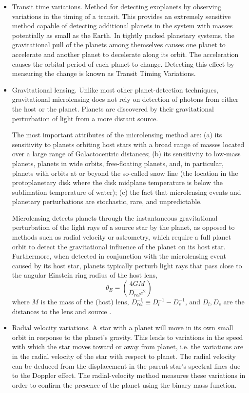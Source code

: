 \begin{itemize}
\item Transit time variations.
Method for detecting exoplanets by observing variations in the timing of a transit. This provides an extremely sensitive method capable of detecting additional planets in the system with masses potentially as small as the Earth. In tightly packed planetary systems, the gravitational pull of the planets among themselves causes one planet to accelerate and another planet to decelerate along its orbit. The acceleration causes the orbital period of each planet to change. Detecting this effect by measuring the change is known as Transit Timing Variations.

\item Gravitational lensing. Unlike most other planet-detection techniques, gravitational microlensing
does not rely on detection of photons from either the host or the planet. Planets are discovered 
by their gravitational perturbation of light from a more distant source.

The most important attributes of the microlensing method are: (a) its sensitivity to planets orbiting
host stars with a broad range of masses located over a large range of Galactocentric distances;
(b) its sensitivity to low-mass planets, planets in wide orbits, free-floating planets, and, in particular,
planets with orbits at or beyond the so-called snow line (the location in the protoplanetary disk
where the disk midplane temperature is below the sublimation temperature of water); (c) the
fact that microlensing events and planetary perturbations are stochastic, rare, and unpredictable.

Microlensing detects planets through the instantaneous gravitational perturbation of the light
rays of a source star by the planet, as opposed to methods such as radial velocity or astrometry,
which require a full planet orbit to detect the gravitational influence of the planet on its host star.
Furthermore, when detected in conjunction with the microlensing event caused by its host star,
planets typically perturb light rays that pass close to the angular Einstein ring radius of the host
lens,
\begin{equation} \label{eq:ml_ring}
\theta_{E}\equiv \left( \dfrac{4GM}{D_{rel}c^{2}} \right) 
\end{equation}
where $M$ is the mass of the (host) lens, $D^{−1}_{rel} \equiv D^{−1}_{l} - D^{−1}_{s}$, and $D_{l},D_{s}$ 
are the distances to the lens and source \citep{gaudi2012}.

\item Radial velocity variations. 
A star with a planet will move in its own small orbit in response to the planet's gravity. This leads to variations in the speed with which the star moves toward or away from planet, i.e. the variations are in the radial velocity of the star with respect to planet. The radial velocity can be deduced from the displacement in the parent star's spectral lines due to the Doppler effect. The radial-velocity method measures these variations in order to confirm the presence of the planet using the binary mass function.


\end{itemize}

